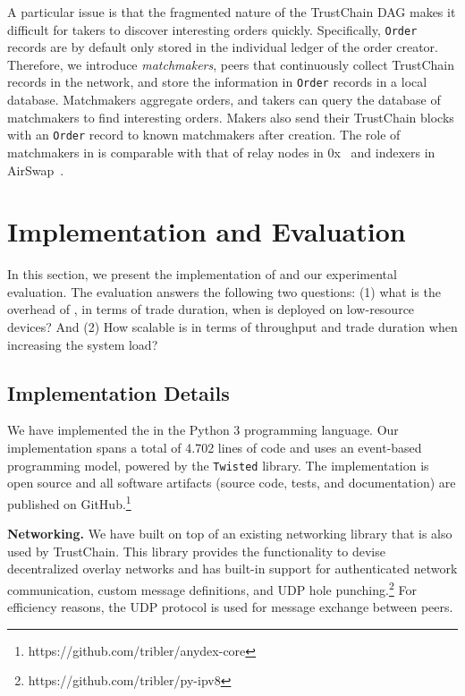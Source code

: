 A particular issue is that the fragmented nature of the TrustChain DAG makes it difficult for takers to discover interesting orders quickly.
Specifically, \texttt{Order} records are by default only stored in the individual ledger of the order creator.
Therefore, we introduce \emph{matchmakers}, peers that continuously collect TrustChain records in the network, and store the information in \texttt{Order} records in a local database.
Matchmakers aggregate orders, and takers can query the database of matchmakers to find interesting orders.
Makers also send their TrustChain blocks with an \texttt{Order} record to known matchmakers after creation.
The role of matchmakers in \ModelName{} is comparable with that of relay nodes in 0x~\cite{warren20170x} and indexers in AirSwap~\cite{airswap}.

\section{Implementation and Evaluation}
\label{sec:evaluation}
In this section, we present the implementation of \ModelName{} and our experimental evaluation.
The evaluation answers the following two questions: (1) what is the overhead of \ModelName{}, in terms of trade duration, when \ModelName{} is deployed on low-resource devices? And (2) How scalable is \ModelName{} in terms of throughput and trade duration when increasing the system load?

\subsection{Implementation Details}
\label{sec:implementation}
We have implemented the \ModelName{} in the Python 3 programming language.
Our implementation spans a total of 4.702 lines of code and uses an event-based programming model, powered by the \texttt{Twisted} library.
The implementation is open source and all software artifacts (source code, tests, and documentation) are published on GitHub.\footnote{https://github.com/tribler/anydex-core}

\textbf{Networking.}
We have built \ModelName{} on top of an existing networking library that is also used by TrustChain.
This library provides the functionality to devise decentralized overlay networks and has built-in support for authenticated network communication, custom message definitions, and UDP hole punching.\footnote{https://github.com/tribler/py-ipv8}
For efficiency reasons, the UDP protocol is used for message exchange between peers.

